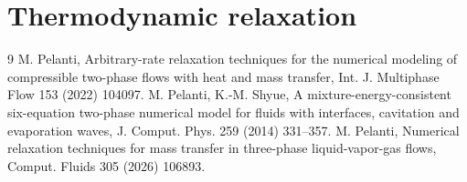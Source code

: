 \documentclass[11pt]{article}
\begin{document}
\section{Thermodynamic relaxation}


\begin{thebibliography}{9}
 M. Pelanti, Arbitrary-rate relaxation techniques for the numerical modeling of
compressible two-phase flows with heat and mass transfer, Int. J. Multiphase Flow 153 (2022) 104097.
 M. Pelanti, K.-M. Shyue, A mixture-energy-consistent six-equation two-phase numerical
model for fluids with interfaces, cavitation and evaporation waves, J. Comput. Phys. 259 (2014) 331--357.
 M. Pelanti, Numerical relaxation techniques for mass transfer in three-phase liquid-vapor-gas
flows, Comput. Fluids 305 (2026) 106893.
\end{thebibliography}
\end{document}
